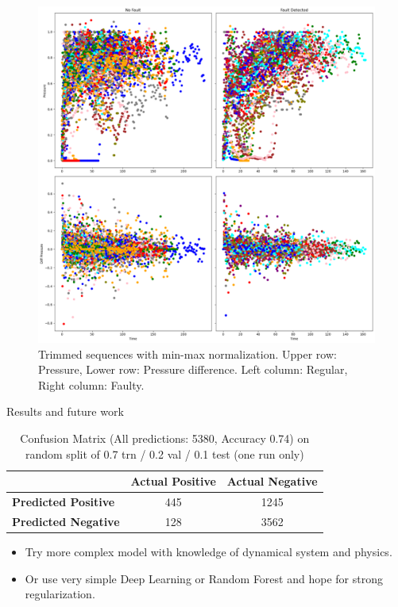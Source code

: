 \documentclass{beamer}
\begin{document}
\begin{frame}
    \begin{figure}
        \centering
        \includegraphics[width=0.67\linewidth]{more_all_faults_only_half.png}
        \caption{ \footnotesize Trimmed sequences with min-max normalization. Upper row: Pressure, Lower row: Pressure difference. Left column: Regular, Right column: Faulty.}
    \end{figure}
\end{frame}


\begin{frame}{Results and future work}
    \begin{table}[h]
        \centering
        \begin{tabular}{|l|c|c|}
        \hline
        \multicolumn{1}{|c|}{\textbf{}}                & \multicolumn{1}{l|}{\textbf{Actual Positive}} & \multicolumn{1}{l|}{\textbf{Actual Negative}} \\ \hline
        \multicolumn{1}{|l|}{\textbf{Predicted Positive}} & 445                                            & 1245                                          \\ \hline
        \multicolumn{1}{|l|}{\textbf{Predicted Negative}} & 128                                            & 3562                                          \\ \hline
        \end{tabular}
        \caption{Confusion Matrix (All predictions: 5380, Accuracy 0.74)  on random split of 0.7 trn / 0.2 val / 0.1 test (one run only)}
        \end{table}
    \begin{itemize}
        \item Try more complex model with knowledge of dynamical system and physics.
        \item Or use very simple Deep Learning or Random Forest and hope for strong regularization.
    \end{itemize}
\end{frame}
\end{document}
